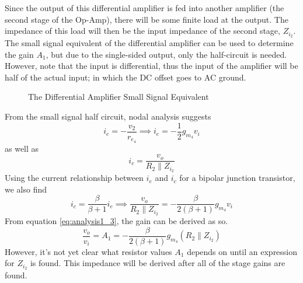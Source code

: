 \documentclass[lettersize,journal]{IEEEtran}
\begin{document}
\IEEEpubidadjcol
Since the output of this differential amplifier is fed into another amplifier (the 
second stage of the Op-Amp), there will be some finite load at the output. The impedance 
of this load will then be the input impedance of the second stage, $Z_{i_2}$. The 
small signal equivalent of the differential amplifier can be used to determine the 
gain $A_1$, but due to the single-sided output, only the half-circuit is needed.  
However, note that the input is differential, thus the input of the amplifier will 
be half of the actual input; in which the DC offset goes to AC ground.
\begin{figure}[H]
  \centering
  \caption{The Differential Amplifier Small Signal Equivalent}
  \label{fig:differentialampsmallsignal}
\end{figure}

\IEEEpubidadjcol
From the small signal half circuit, nodal analysis suggests
\begin{equation}
\label{eq:analysis1_1}
i_e = -\frac{v_2}{r_{e_4}} \implies i_e = -\frac{1}{2} g_{m_4}v_i
\end{equation}
as well as
\begin{equation}
\label{eq:analysis1_2}
i_c = \frac{v_o}{R_2 \parallel Z_{i_2}}
\end{equation}
Using the current relationship between $i_e$ and $i_c$ for a bipolar 
junction transistor, we also find
\begin{equation}
\label{eq:analysis1_3}
i_c = \frac{\beta}{\beta+1} i_e \implies \frac{v_o}{R_2 \parallel Z_{i_2}} = -\frac{\beta}{2\left(\beta+1\right)} g_{m_4}v_i
\end{equation}
From equation \eqref{eq:analysis1_3}, the gain 
can be derived as so.
\begin{equation}
\label{eq:gainA1}
\frac{v_o}{v_i} = A_1 = -\frac{\beta}{2\left(\beta+1\right)} g_{m_4} \left(R_2 \parallel Z_{i_2}\right)
\end{equation}
However, it's not yet clear what resistor values $A_1$ depends on until an expression for 
$Z_{i_2}$ is found. This impedance will be derived after all of the stage gains are found.
\end{document}
